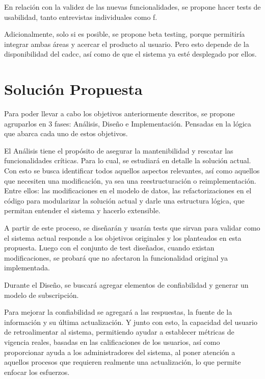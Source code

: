     \par En relación con la validez de las nuevas funcionalidades, se propone hacer tests de usabilidad, tanto entrevistas individuales como \acrlong{f}.
    
    \par Adicionalmente, solo si es posible, se propone beta testing, porque permitiría integrar ambas áreas y acercar el producto al usuario. Pero esto depende de la disponibilidad del \acrshort{cadcc}, así como de que el sistema ya esté desplegado por ellos.

\section{Solución Propuesta}\label{sec:intro-sol}
    \par Para poder llevar a cabo los objetivos anteriormente descritos, se propone agruparlos en 3 fases: Análisis, Diseño e Implementación. Pensadas en la lógica que abarca cada uno de estos objetivos.
    
    \par El Análisis tiene el propósito de asegurar la mantenibilidad y rescatar las funcionalidades críticas. Para lo cual, se estudiará en detalle la solución actual. Con esto se busca identificar todos aquellos aspectos relevantes, así como aquellos que necesiten una modificación, ya sea una reestructuración o reimplementación. Entre ellos: las modificaciones en el modelo de datos, las refactorizaciones en el código para modularizar la solución actual y darle una estructura lógica, que permitan entender el sistema y hacerlo extensible.
    
    \par A partir de este proceso, se diseñarán y usarán tests que sirvan para validar como el sistema actual responde a los objetivos originales y los planteados en esta propuesta. Luego con el conjunto de test diseñados, cuando existan modificaciones, se probará que no afectaron la funcionalidad original ya implementada.
    
    \par Durante el Diseño,  se buscará agregar elementos de confiabilidad y generar un modelo de subscripción.
    
    \par Para mejorar la confiabilidad se agregará a las respuestas, la fuente de la información y su última actualización. Y junto con esto, la capacidad del usuario de retroalimentar al sistema, permitiendo ayudar a establecer métricas de vigencia reales, basadas en las calificaciones de los usuarios, así como proporcionar ayuda a los administradores del sistema, al poner atención a aquellos procesos que requieren realmente una actualización, lo que permite enfocar los esfuerzos.
    
